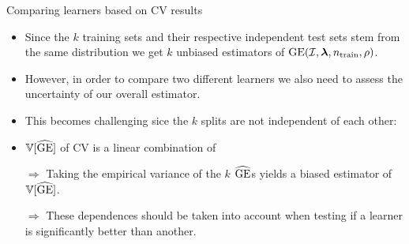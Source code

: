 \begin{vbframe}{Comparing learners based on CV results}
\begin{footnotesize}
\begin{itemize}
\item Since the $k$ training sets and their respective independent test sets stem
from the same distribution we get $k$ unbiased estimators of $\mathrm{GE}(\mathcal{I}, \bm{\lambda}, n_{\mathrm{train}}, \rho)$.
\item However, in order to compare two different learners we also need to assess the 
uncertainty of our overall  estimator.
\item This becomes challenging sice the $k$ splits are not independent of each other: 
\item $\mathbb{V}[\widehat{\mathrm{GE}}]$ of CV is a linear combination of 
\begin{itemize}
\end{itemize}
\item[$\Rightarrow$] Taking the empirical variance of the $k$ $\widehat{\mathrm{GE}}$s yields a biased 
estimator of $\mathbb{V}[\widehat{\mathrm{GE}}]$.
\item[$\Rightarrow$] These dependences should be taken into account 
when testing if a learner is significantly better than another. 

\end{itemize}
\end{footnotesize}
\end{vbframe}


